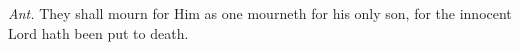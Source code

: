 \begin{Parallel}[v]{\colw}{\colx}
{}
{\vern
{\noindent
\textit{Ant.} They shall mourn for Him as one mourneth for his only son, for the innocent Lord hath been put to death.}}

\end{Parallel}